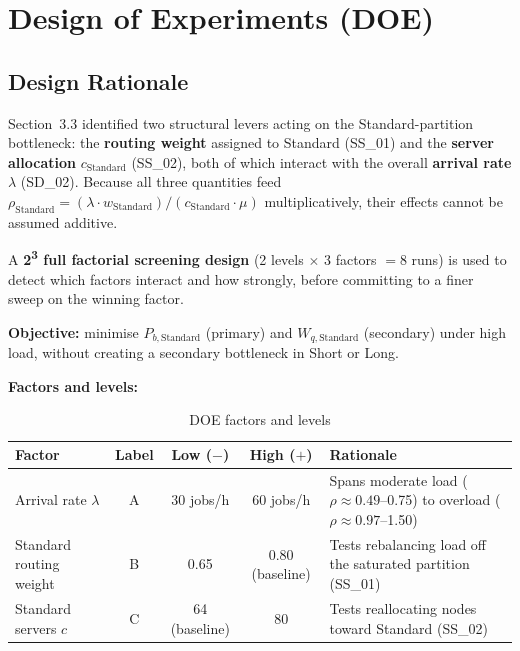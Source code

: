 \documentclass[11pt,a4paper]{article}
\newcommand{\lam}{\ensuremath{\lambda}}
\newcommand{\murate}{\ensuremath{\mu}}
\begin{document}
\section{Design of Experiments (DOE)}
\label{sec:doe}

\subsection{Design Rationale}

Section~3.3 identified two structural levers acting on the Standard-partition bottleneck: the
\textbf{routing weight} assigned to Standard (SS\_01) and the \textbf{server allocation} $c_\text{Standard}$
(SS\_02), both of which interact with the overall \textbf{arrival rate} $\lam$ (SD\_02). Because all
three quantities feed $\rho_\text{Standard} = (\lam \cdot w_\text{Standard}) / (c_\text{Standard} \cdot
\murate)$ multiplicatively, their effects cannot be assumed additive.

A \textbf{2\textsuperscript{3} full factorial screening design} (2 levels $\times$ 3 factors $= 8$ runs)
is used to detect which factors interact and how strongly, before committing to a finer sweep on the
winning factor.

\textbf{Objective:} minimise $P_{b,\text{Standard}}$ (primary) and $W_{q,\text{Standard}}$ (secondary)
under high load, without creating a secondary bottleneck in Short or Long.

\textbf{Factors and levels:}

\begin{table}[H]
\centering
\caption{DOE factors and levels}
\begin{tabularx}{\linewidth}{lcccX}
\toprule
\textbf{Factor} & \textbf{Label} & \textbf{Low ($-$)} & \textbf{High ($+$)} & \textbf{Rationale} \\
\midrule
Arrival rate $\lam$       & A & 30 jobs/h     & 60 jobs/h       & Spans moderate load ($\rho \approx 0.49$--0.75) to overload ($\rho \approx 0.97$--1.50) \\
Standard routing weight   & B & 0.65          & 0.80 (baseline) & Tests rebalancing load off the saturated partition (SS\_01) \\
Standard servers $c$      & C & 64 (baseline) & 80              & Tests reallocating nodes toward Standard (SS\_02) \\
\bottomrule
\end{tabularx}
\end{table}
\end{document}
